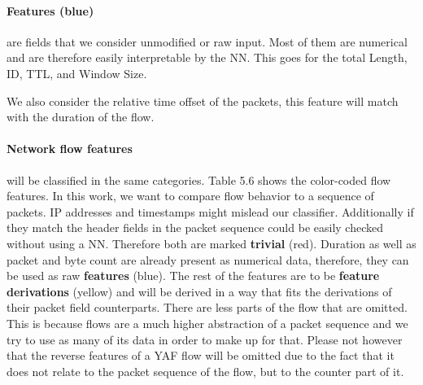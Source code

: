 \documentclass[
	ngerman,
	ruledheaders=section,%
	class=report,%
	thesis={type=bachelor},%
	accentcolor=9c,%
	custommargins=true,%
	marginpar=false,%
	parskip=half-,%
	fontsize=11pt,%
]{tudapub}
\begin{document}
\paragraph{\colorbox{feature}{\textbf{Features} (blue)}} are fields that we consider unmodified or raw input.
Most of them are numerical and are therefore easily interpretable by the NN.
This goes for the total Length, ID, TTL, and Window Size.

We also consider the relative time offset of the packets, this feature will match with the duration of the flow.

\paragraph{Network flow features} will be classified in the same categories.
Table 5.6 shows the color-coded flow features.
In this work, we want to compare flow behavior to a sequence of packets.
IP addresses and timestamps might mislead our classifier.
Additionally if they match the header fields in the packet sequence could be easily checked without using a NN.
Therefore both are marked \colorbox{trivial}{\textbf{trivial} (red)}.
Duration as well as packet and byte count are already present as numerical data, therefore, they can be used as raw \colorbox{feature}{\textbf{features} (blue)}.
The rest of the features are to be \colorbox{derivation}{\textbf{feature derivations} (yellow)} and will be derived in a way that fits the derivations of their packet field counterparts.
There are less parts of the flow that are omitted.
This is because flows are a much higher abstraction of a packet sequence and we try to use as many of its data in order to make up for that.
Please not however that the reverse features of a YAF flow will be omitted due to the fact that it does not relate to the packet sequence of the flow, but to the counter part of it.


\end{document}
